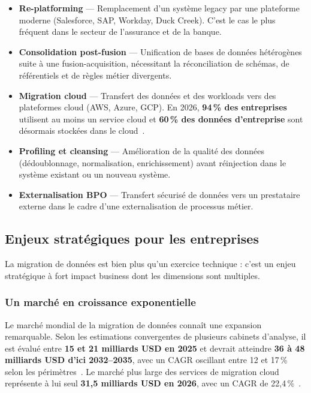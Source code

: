 \begin{itemize}
    \item \textbf{Re-platforming} --- Remplacement d'un système legacy par
    une plateforme moderne (Salesforce, SAP, Workday, Duck Creek). C'est le
    cas le plus fréquent dans le secteur de l'assurance et de la banque.

    \item \textbf{Consolidation post-fusion} --- Unification de bases de
    données hétérogènes suite à une fusion-acquisition, nécessitant la
    réconciliation de schémas, de référentiels et de règles métier
    divergents.

    \item \textbf{Migration cloud} --- Transfert des données et des
    workloads vers des plateformes cloud (AWS, Azure, GCP). En 2026,
    \textbf{94\,\% des entreprises} utilisent au moins un service cloud
    et \textbf{60\,\% des données d'entreprise} sont désormais stockées
    dans le cloud~\cite{medhacloud2026, datastackhub2026}.

    \item \textbf{Profiling et cleansing} --- Amélioration de la qualité
    des données (dédoublonnage, normalisation, enrichissement) avant
    réinjection dans le système existant ou un nouveau système.

    \item \textbf{Externalisation BPO} --- Transfert sécurisé de données
    vers un prestataire externe dans le cadre d'une externalisation de
    processus métier.
\end{itemize}

\subsection{Enjeux stratégiques pour les entreprises}

La migration de données est bien plus qu'un exercice technique : c'est un
enjeu stratégique à fort impact business dont les dimensions sont multiples.

\subsubsection{Un marché en croissance exponentielle}

Le marché mondial de la migration de données connaît une expansion
remarquable. Selon les estimations convergentes de plusieurs cabinets
d'analyse, il est évalué entre \textbf{15 et 21 milliards USD en 2025}
et devrait atteindre \textbf{36 à 48 milliards USD d'ici 2032--2035},
avec un CAGR oscillant entre 12 et 17\,\% selon les
périmètres~\cite{datamintel2026, reportsanddata2026, researchandmarkets2026,
fortunebi2026}. Le marché plus large des services de migration cloud
représente à lui seul \textbf{31,5 milliards USD en 2026}, avec un CAGR
de 22,4\,\%~\cite{medhacloud2026}.

